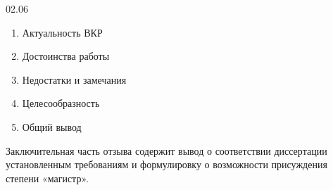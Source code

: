 \documentclass[../document.tex]{subfiles}
\begin{document}
    \begin{review}{}{02.06}
        \begin{enumerate}
            \item Актуальность ВКР
            \item Достоинства работы
            \item Недостатки и замечания
            \item Целесообразность
            \item Общий вывод
        \end{enumerate}
        Заключительная часть отзыва содержит вывод о соответствии диссертации установленным
        требованиям и формулировку о возможности присуждения степени «магистр».
    \end{review}
\end{document}

